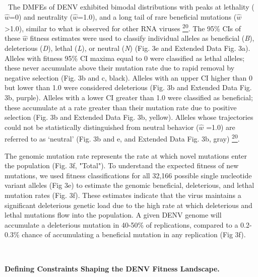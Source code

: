 \documentclass[
]{article}
\begin{document}
~The DMFEs of DENV exhibited bimodal distributions with peaks at
lethality (\(\widehat{w}\)=0) and neutrality (\(\widehat{w}\)=1.0), and
a long tail of rare beneficial mutations
(\(\widehat{w}\)\textgreater1.0), similar to what is observed for other
RNA viruses
\href{https://paperpile.com/c/REZjPf/bczFl}{\textsuperscript{20}}. The
95\% CIs of these \(\widehat{w}\) fitness estimates were used to
classify individual alleles as beneficial (\emph{B}), deleterious
(\emph{D}), lethal (\emph{L}), or neutral (\emph{N}) (Fig. 3e and
Extended Data Fig. 3a). Alleles with fitness 95\% CI maxima equal to 0
were classified as lethal alleles; these never accumulate above their
mutation rate due to rapid removal by negative selection (Fig. 3b and c,
black). Alleles with an upper CI higher than 0 but lower than 1.0 were
considered deleterious (Fig. 3b and Extended Data Fig. 3b, purple).
Alleles with a lower CI greater than 1.0 were classified as beneficial;
these accumulate at a rate greater than their mutation rate due to
positive selection (Fig. 3b and Extended Data Fig. 3b, yellow). Alleles
whose trajectories could not be statistically distinguished from neutral
behavior (\(\widehat{w}\) =1.0) are referred to as `neutral' (Fig. 3b
and e, and Extended Data Fig. 3b, gray)
\href{https://paperpile.com/c/REZjPf/bczFl}{\textsuperscript{20}}.

The genomic mutation rate represents the rate at which novel mutations
enter the population (Fig. 3f, "Total"). To understand the expected
fitness of new mutations, we used fitness classifications for all 32,166
possible single nucleotide variant alleles (Fig 3e) to estimate the
genomic beneficial, deleterious, and lethal mutation rates (Fig. 3f).
These estimates indicate that the virus maintains a significant
deleterious genetic load due to the high rate at which deleterious and
lethal mutations flow into the population. A given DENV genome will
accumulate a deleterious mutation in 40-50\% of replications, compared
to a 0.2-0.3\% chance of accumulating a beneficial mutation in any
replication (Fig 3f).

~

\textbf{Defining Constraints Shaping the DENV Fitness Landscape.}
\end{document}
